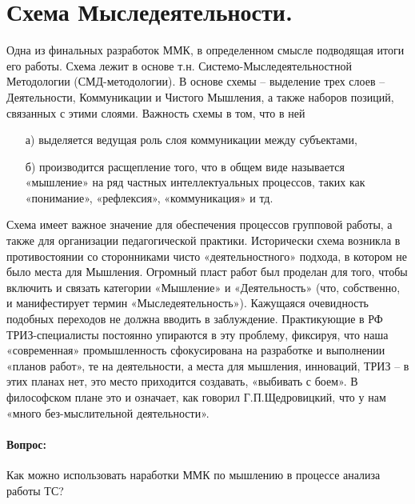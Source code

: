 \documentclass[11pt,a4paper]{article}
\begin{document}
\section{Схема Мыследеятельности.}
Одна из финальных разработок ММК, в определенном смысле подводящая итоги его
работы. Схема лежит в основе т.н. Системо-Мыследеятельностной Методологии
(СМД-методологии). В основе схемы – выделение трех слоев – Деятельности,
Коммуникации и Чистого Мышления, а также наборов позиций, связанных с этими
слоями. Важность схемы в том, что в ней 
\begin{itemize}
\item[а)] выделяется ведущая роль слоя коммуникации между субъектами,
\item[б)] производится расщепление того, что в общем виде называется
  «мышление» на ряд частных интеллектуальных процессов, таких как «понимание»,
  «рефлексия», «коммуникация» и тд.
\end{itemize}
Схема имеет важное значение для обеспечения процессов групповой работы, а
также для организации педагогической практики. Исторически схема возникла в
противостоянии со сторонниками чисто «деятельностного» подхода, в котором не
было места для Мышления. Огромный пласт работ был проделан для того, чтобы
включить и связать категории «Мышление» и «Деятельность» (что, собственно, и
манифестирует термин «Мыследеятельность»). Кажущаяся очевидность подобных
переходов не должна вводить в заблуждение. Практикующие в РФ ТРИЗ-специалисты
постоянно упираются в эту проблему, фиксируя, что наша «современная»
промышленность сфокусирована на разработке и выполнении «планов работ», те на
деятельности, а места для мышления, инноваций, ТРИЗ – в этих планах нет, это
место приходится создавать, «выбивать с боем». В философском плане это и
означает, как говорил Г.П.Щедровицкий, что у нам «много без-мыслительной
деятельности».

\paragraph{Вопрос:}
Как можно использовать наработки ММК по мышлению в процессе анализа работы ТС?
\end{document}
